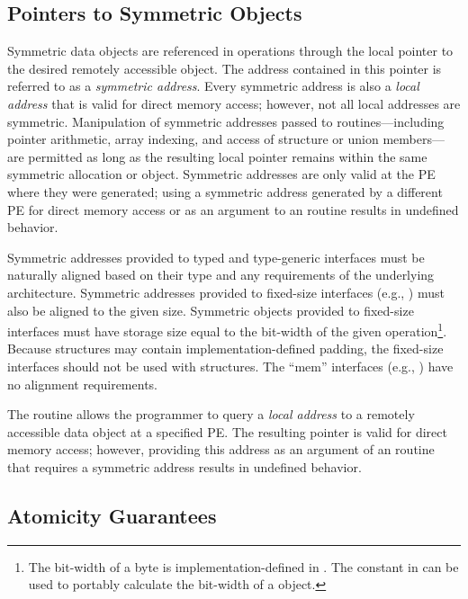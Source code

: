 \subsection{Pointers to Symmetric Objects}\label{subsec:pointers_to_symmetric_objects}

Symmetric data objects are referenced in \openshmem operations through the
local pointer to the desired remotely accessible object.  The address contained
in this pointer is referred to as a {\em symmetric address}.  Every symmetric
address is also a {\em local address} that is valid for direct memory access;
however, not all local addresses are symmetric.  Manipulation of symmetric
addresses passed to \openshmem routines---including pointer arithmetic,
array indexing, and access of structure or union members---are permitted as long as
the resulting local pointer remains within the same symmetric allocation or
object.  Symmetric addresses are only valid at the \ac{PE} where they were
generated; using a symmetric address generated by a different \ac{PE} for
direct memory access or as an argument to an \openshmem routine results
in undefined behavior.

Symmetric addresses provided to typed and type-generic \openshmem interfaces
must be naturally aligned based on their type and any requirements of the
underlying architecture.  Symmetric addresses provided to fixed-size \openshmem
interfaces (e.g., ) must also be aligned to the given
size.  Symmetric objects provided to fixed-size \openshmem interfaces
must have storage size equal to the bit-width of the given
operation\footnote{The bit-width of a byte is implementation-defined in \Cstd.  The
 constant in  can be used to portably
calculate the bit-width of a \Cstd object.}.  Because \CorCpp{} structures may
contain implementation-defined padding, the fixed-size interfaces should not be
used with \CorCpp{} structures.
The ``mem'' interfaces (e.g., ) have no alignment
requirements.

The  routine allows the programmer to query a {\em local
address} to a remotely accessible data object at a specified \ac{PE}.  The
resulting pointer is valid for direct memory access; however, providing this
address as an argument of an \openshmem routine that requires a symmetric
address results in undefined behavior.

\subsection{Atomicity Guarantees}\label{subsec:amo_guarantees}

